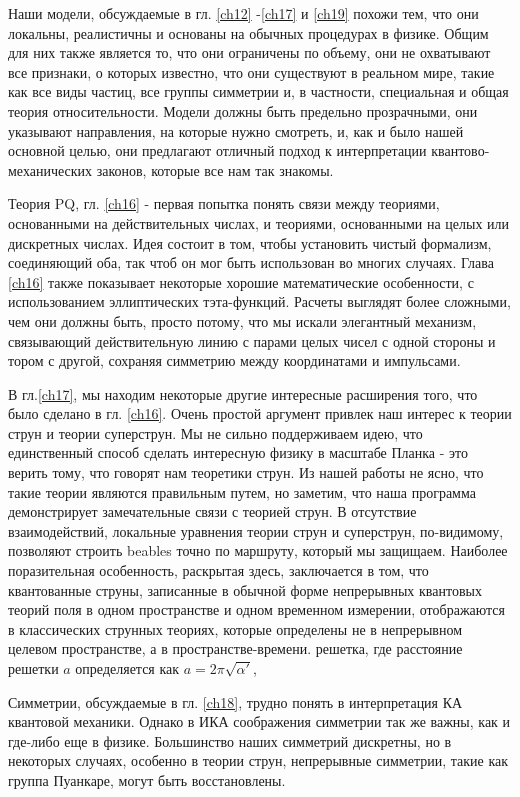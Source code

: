\documentclass[main.tex]{subfiles}
\begin{document}
Наши модели, обсуждаемые в гл. \ref{ch12} -\ref{ch17} и \ref{ch19} похожи тем, что они локальны, реалистичны и основаны на обычных процедурах в физике. Общим для них также является то, что они ограничены по объему, они не охватывают все признаки, о которых известно, что они существуют в реальном мире, такие как все виды частиц, все группы симметрии и, в частности, специальная и общая теория относительности. Модели должны быть предельно прозрачными, они указывают направления, на которые нужно смотреть, и, как и было нашей основной целью, они предлагают отличный подход к интерпретации квантово-механических законов, которые все нам так знакомы.

Теория PQ, гл. \ref{ch16} - первая попытка понять связи между теориями, основанными на действительных числах, и теориями, основанными на целых или дискретных числах. Идея состоит в том, чтобы установить чистый формализм, соединяющий оба, так чтоб он мог быть использован во многих случаях. Глава \ref{ch16} также показывает некоторые хорошие математические особенности, с использованием эллиптических тэта-функций. Расчеты выглядят более сложными, чем они должны быть, просто потому, что мы искали элегантный механизм, связывающий действительную линию с парами целых чисел с одной стороны и тором с другой, сохраняя симметрию между координатами и импульсами.

В гл.\ref{ch17}, мы находим некоторые другие интересные расширения того, что было сделано в гл. \ref{ch16}. Очень простой аргумент привлек наш интерес к теории струн и теории суперструн. Мы не сильно поддерживаем идею, что единственный способ сделать интересную физику в масштабе Планка - это верить тому, что говорят нам теоретики струн. Из нашей работы не ясно, что такие теории являются правильным путем, но заметим, что наша программа демонстрирует замечательные связи с теорией струн. В отсутствие взаимодействий, локальные уравнения теории струн и суперструн, по-видимому, позволяют строить beables точно по маршруту, который мы защищаем. Наиболее поразительная особенность, раскрытая здесь, заключается в том, что квантованные струны, записанные в обычной форме непрерывных квантовых теорий поля в одном пространстве и одном временном измерении, отображаются в классических струнных теориях, которые определены не в непрерывном целевом пространстве, а в пространстве-времени. решетка, где расстояние решетки $a$ определяется как $a = 2\pi\sqrt{\alpha'}$,

Симметрии, обсуждаемые в гл. \ref{ch18}, трудно понять в интерпретация КА квантовой механики. Однако в ИКА соображения симметрии так же важны, как и где-либо еще в физике. Большинство наших симметрий дискретны, но в некоторых случаях, особенно в теории струн, непрерывные симметрии, такие как группа Пуанкаре, могут быть восстановлены.
\end{document}
